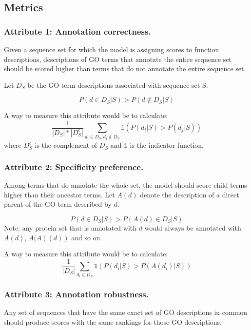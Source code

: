 \documentclass{specification}
\begin{document}
    \subsection{Metrics}
        \subsubsection{Attribute 1: Annotation correctness.}

        Given a sequence set for which the model is assigning scores to function descriptions, descriptions of GO terms that annotate the entire sequence set should be scored higher than terms that do not annotate the entire sequence set.

        Let $D_{S}$ be the GO term descriptions associated with sequence set S.

        \[P(d \in D_{S} | S) > P(d \notin D_{S} | S)\]

        A way to measure this attribute would be to calculate:
        \[\frac{1}{|D_{S}|*|D_{S}^{c}|}\sum_{d_i \in D_{S}, d_j \notin D_{S}} \mathds{1}(P(d_i | S) > P(d_j | S))\]
        where $D_{S}^{c}$ is the complement of $D_{S}$ and $\mathds{1}$ is the indicator function.

        \subsubsection{Attribute 2: Specificity preference.}

        Among terms that do annotate the whole set, the model should score child terms higher than their ancestor terms.
Let $A(d)$ denote the description of a direct parent of the GO term described by $d$.

        \[P(d \in D_{S}| S) > P(A(d) \in D_{S}| S)\]
        Note: any protein set that is annotated with $d$ would always be annotated with $A(d)$, $A(A((d))$ and so on.

        A way to measure this attribute would be to calculate:
        \[\frac{1}{|D_{S}|}\sum_{d_i \in D_{S}} \mathds{1}(P(d_i | S) > P(A(d_i) | S))\]

        \subsubsection{Attribute 3: Annotation robustness.}

        Any set of sequences that have the same exact set of GO descriptions in common should produce scores with the same rankings for those GO descriptions.
\end{document}
